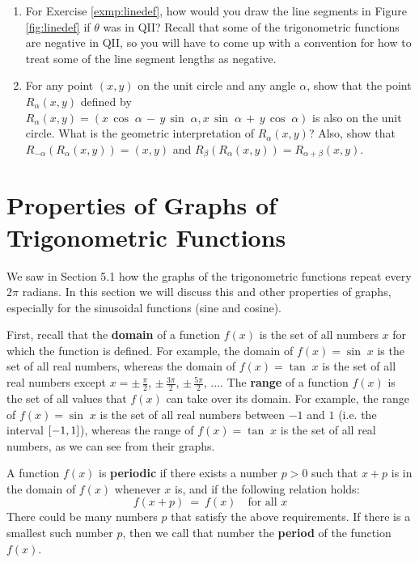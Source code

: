 {\begin{enumerate}[\bfseries 1.]
  with the positive $x$-axis. Identify each of the six trigonometric functions of $\theta$ with
  exactly one of the line segments in Figure \ref{fig:linedef}, keeping in mind that the radius of
  the circle is $1$. To get you started, we have $\sin\;\theta = MP$ (why?).
 \item For Exercise \ref{exmp:linedef},
  how would you draw the line segments in Figure \ref{fig:linedef} if $\theta$ was in QII?
  Recall that some of the trigonometric functions are negative in QII, so you will have to come up
  with a convention for how to treat some of the line segment lengths as negative.
 \item For any point $(x,y)$ on the unit circle and any angle $\alpha$, show that the point
  $R_{\alpha} (x,y)$ defined by $R_{\alpha} (x,y)
  = (x\,\cos\;\alpha \,-\, y\,\sin\;\alpha , x\,\sin\;\alpha \,+\, y\,\cos\;\alpha)$ is also on the
  unit circle. What is the geometric interpretation of $R_{\alpha} (x,y)$? Also, show that
  $R_{-\alpha} (R_{\alpha} (x,y)) = (x,y)$ and $R_{\beta} (R_{\alpha} (x,y)) = R_{\alpha + \beta}
  (x,y)$.
\end{enumerate}}

\newpage
\section{Properties of Graphs of Trigonometric Functions}
We saw in Section 5.1 how the graphs of the trigonometric functions repeat every $2\pi$ radians.
In this section we will discuss this and other properties of graphs, especially for the sinusoidal
functions (sine and cosine).

First, recall that the \textbf{domain} of a function $f(x)$ is the
set of all numbers $x$ for which the function is defined. For example, the domain of $f(x) =
\sin\;x$ is the set of all real numbers, whereas the domain of $f(x) = \tan\;x$ is the set of all
real numbers except $x=\pm\,\frac{\pi}{2}$, $\pm\,\frac{3\pi}{2}$, $\pm\,\frac{5\pi}{2}$, $...$.
The \textbf{range} of a function $f(x)$ is the set of all values that
$f(x)$ can take over its domain. For example, the range of $f(x)=\sin\;x$ is the set of all real
numbers between $-1$ and $1$ (i.e. the interval $\lbrack -1,1 \rbrack$), whereas the range of $f(x) =
\tan\;x$ is the set of all real numbers, as we can see from their graphs.

A function $f(x)$ is \textbf{periodic} if there exists a number $p>0$ such that $x+p$ is
in the domain of $f(x)$ whenever $x$ is, and if the following relation holds:
\begin{equation}\label{eqn:periodic}
 f(x+p) ~=~ f(x) \quad\text{for all $x$}
\end{equation}
There could be many numbers $p$ that satisfy the above requirements. If there is a smallest such
number $p$, then we call that number the \textbf{period} of the
function $f(x)$.

